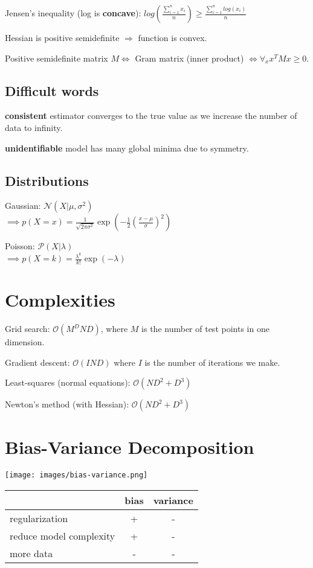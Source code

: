 \documentclass[10pt,a4paper,landscape]{article}
\begin{document}
\begin{multicols*}{4}
Jensen's inequality (log is \textbf{concave}): $log(\frac{\sum_{i=1}^n x_i}{n}) \ge \frac{\sum_{i=1}^n log(x_i)}{n}$

Hessian is positive semidefinite $\Rightarrow$ function is convex.

Positive semidefinite matrix $M \Leftrightarrow$ Gram matrix (inner product) $\Leftrightarrow \forall_x x^T M x \ge 0$.

\subsection{Difficult words}
\textbf{consistent} estimator converges to the true value as we increase the
number of data to infinity.

\textbf{unidentifiable} model has many global minima due to symmetry.

\subsection{Distributions}
  Gaussian: $\mathcal{N}(X| \mu, \sigma^2)$ \\
  $\implies p(X = x) = \frac{1}{\sqrt{2 \pi \sigma^2}} \exp{(- \frac{1}{2} ( \frac{x - \mu}{\sigma} )^2)}$

  Poisson: $\mathcal{P}(X| \lambda)$ \\
  $\implies p(X = k) = \frac{\lambda ^ k}{k!} \exp{(- \lambda)}$

\section{Complexities}
Grid search: $\mathcal{O}(M^D N D)$, where $M$ is the number of test points in one dimension.

Gradient descent: $\mathcal{O}(I N D)$ where $I$ is the number of iterations we make.

Least-squares (normal equations): $\mathcal{O}(ND^2 + D^3)$

Newton's method (with Hessian): $\mathcal{O}(ND^2 + D^3)$

\section{Bias-Variance Decomposition}
  \begin{colfig}
    \centering
    \texttt{[image: images/bias-variance.png]}
  \end{colfig}

  \begin{tabular}{ l || c | c }
                            & bias & variance \\
    \hline
    regularization          & +    & - \\
    reduce model complexity & +    & - \\
    more data               & -    & - \\
    \hline
  \end{tabular}


\end{multicols*}
\end{document}
